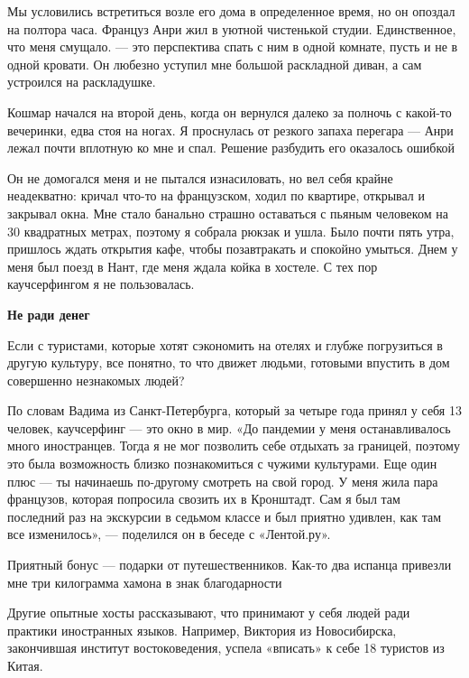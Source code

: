 Мы условились встретиться возле его дома в определенное время, но он опоздал на полтора часа. Француз Анри жил в уютной чистенькой студии. Единственное, что меня смущало. — это перспектива спать с ним в одной комнате, пусть и не в одной кровати. Он любезно уступил мне большой раскладной диван, а сам устроился на раскладушке.

\begin{center}
    \Large
    Кошмар начался на второй день, когда он вернулся далеко за полночь с какой-то вечеринки, едва стоя на ногах. Я проснулась от резкого запаха перегара — Анри лежал почти вплотную ко мне и спал. Решение разбудить его оказалось ошибкой
\end{center}

Он не домогался меня и не пытался изнасиловать, но вел себя крайне неадекватно: кричал что-то на французском, ходил по квартире, открывал и закрывал окна. Мне стало банально страшно оставаться с пьяным человеком на 30 квадратных метрах, поэтому я собрала рюкзак и ушла. Было почти пять утра, пришлось ждать открытия кафе, чтобы позавтракать и спокойно умыться. Днем у меня был поезд в Нант, где меня ждала койка в хостеле. С тех пор каучсерфингом я не пользовалась.

\textbf{Не ради денег}

Если с туристами, которые хотят сэкономить на отелях и глубже погрузиться в другую культуру, все понятно, то что движет людьми, готовыми впустить в дом совершенно незнакомых людей?

По словам Вадима из Санкт-Петербурга, который за четыре года принял у себя 13 человек, каучсерфинг — это окно в мир. «До пандемии у меня останавливалось много иностранцев. Тогда я не мог позволить себе отдыхать за границей, поэтому это была возможность близко познакомиться с чужими культурами. Еще один плюс — ты начинаешь по-другому смотреть на свой город. У меня жила пара французов, которая попросила свозить их в Кронштадт. Сам я был там последний раз на экскурсии в седьмом классе и был приятно удивлен, как там все изменилось», — поделился он в беседе с «Лентой.ру».

\begin{fancyquotes}
    Приятный бонус — подарки от путешественников. Как-то два испанца привезли мне три килограмма хамона в знак благодарности
\end{fancyquotes}

Другие опытные хосты рассказывают, что принимают у себя людей ради практики иностранных языков. Например, Виктория из Новосибирска, закончившая институт востоковедения, успела «вписать» к себе 18 туристов из Китая.

